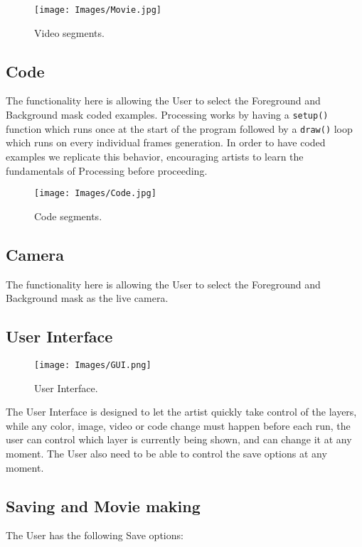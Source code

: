 \documentclass[a4paper]{report}
\begin{document}
\begin{figure}[!ht]
\centering
\texttt{[image: Images/Movie.jpg]}
\caption{\label{fig:Doughnut} Video segments.}
\end{figure}
\clearpage

\subsection{Code}
The functionality here is allowing the User to select the Foreground and Background mask coded examples. Processing \cite{PROCESSING} works by having a 
\verb|setup()| function which runs once at the start of the program followed by a \verb|draw()| loop which runs on every individual frames generation. In order to have coded examples we replicate this behavior, encouraging artists to learn the fundamentals of Processing before proceeding.

\begin{figure}[!ht]
\centering
\texttt{[image: Images/Code.jpg]}
\caption{\label{fig:Doughnut} Code segments.}
\end{figure}

\subsection{Camera}
The functionality here is allowing the User to select the Foreground and Background mask as the live camera.

\subsection{User Interface}

\begin{figure}[!ht]
\centering
\texttt{[image: Images/GUI.png]}
\caption{\label{fig:Doughnut} User Interface.}
\end{figure}

The User Interface is designed to let the artist quickly take control of the layers, while any color, image, video or code change must happen before each run, the user can control which layer is currently being shown, and can change it at any moment. The User also need to be able to control the save options at any moment.

\subsection{Saving and Movie making}
The User has the following Save options:
\end{document}
